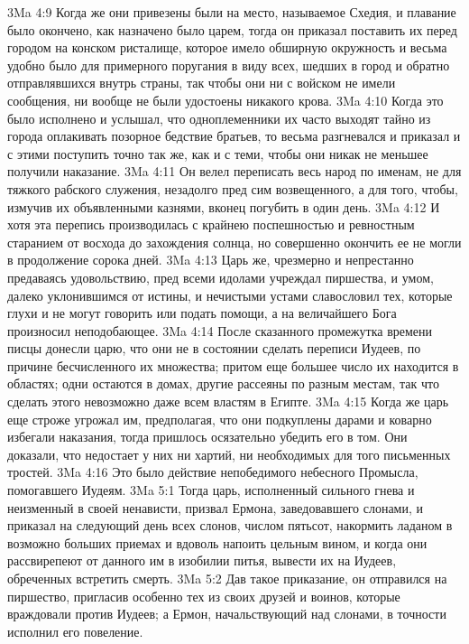 \vs 3Ma 4:9 Когда же они привезены были на место, называемое Схедия, и плавание было окончено, как назначено было царем, тогда он приказал поставить их перед городом на конском ристалище, которое имело обширную окружность и весьма удобно было для примерного поругания в виду всех, шедших в город и обратно отправлявшихся внутрь страны, так чтобы они ни с войском не имели сообщения, ни вообще не были удостоены никакого крова.
\vs 3Ma 4:10 Когда это было исполнено и  услышал, что одноплеменники их часто выходят тайно из города оплакивать позорное бедствие братьев, то весьма разгневался и приказал и с этими поступить точно так же, как и с теми, чтобы они никак не меньшее получили наказание.
\vs 3Ma 4:11 Он велел переписать весь народ по именам, не для тяжкого рабского служения, незадолго пред сим возвещенного, а для того, чтобы, измучив их объявленными казнями, вконец погубить в один день.
\vs 3Ma 4:12 И хотя эта перепись производилась с крайнею поспешностью и ревностным старанием от восхода до захождения солнца, но совершенно окончить ее не могли в продолжение сорока дней.
\vs 3Ma 4:13 Царь же, чрезмерно и непрестанно предаваясь удовольствию, пред всеми идолами учреждал пиршества, и умом, далеко уклонившимся от истины, и нечистыми устами славословил тех, которые глухи и не могут говорить или подать помощи, а на величайшего Бога произносил неподобающее.
\rsbpar\vs 3Ma 4:14 После сказанного промежутка времени писцы донесли царю, что они не в состоянии сделать переписи Иудеев, по причине бесчисленного их множества; притом еще большее число их находится в областях; одни остаются в домах, другие рассеяны по разным местам, так что сделать этого невозможно даже всем властям в Египте.
\vs 3Ma 4:15 Когда же царь еще строже угрожал им, предполагая, что они подкуплены дарами и коварно избегали наказания, тогда пришлось осязательно убедить его в том. Они доказали, что недостает у них ни хартий, ни необходимых для того письменных тростей.
\vs 3Ma 4:16 Это было действие непобедимого небесного Промысла, помогавшего Иудеям.
\vs 3Ma 5:1 Тогда царь, исполненный сильного гнева и неизменный в своей ненависти, призвал Ермона, заведовавшего слонами, и приказал на следующий день всех слонов, числом пятьсот, накормить ладаном в возможно больших приемах и вдоволь напоить цельным вином, и когда они рассвирепеют от данного им в изобилии питья, вывести их на Иудеев, обреченных встретить смерть.
\vs 3Ma 5:2 Дав такое приказание, он отправился на пиршество, пригласив особенно тех из своих друзей и воинов, которые враждовали против Иудеев; а Ермон, начальствующий над слонами, в точности исполнил его повеление.
